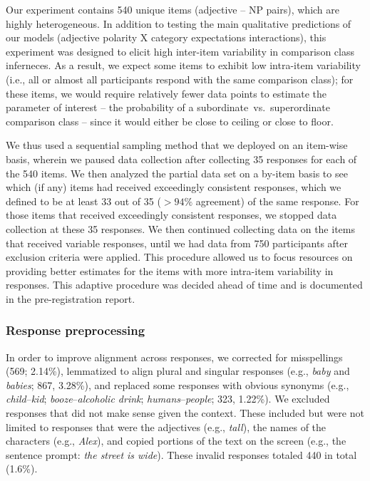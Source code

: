 \documentclass[doc]{apa6}
\begin{document}
Our experiment contains 540 unique items (adjective -- NP pairs), which are highly heterogeneous.
In addition to testing the main qualitative predictions of our models (adjective polarity X category expectations interactions), this experiment was designed to elicit high inter-item variability in comparison class inferneces.
As a result, we expect some items to exhibit low intra-item variability  (i.e., all or almost all participants respond with the same comparison class); for these items, we would require relatively fewer data points to estimate the parameter of interest -- the probability of a subordinate~vs.~superordinate comparison class -- since it would either be close to ceiling or close to floor. 

We thus used a sequential sampling method that we deployed on an item-wise basis, wherein we paused data collection after collecting 35 responses for each of the 540 items.
We then analyzed the partial data set on a by-item basis to see which (if any) items had received exceedingly consistent responses, which we defined to be at least 33 out of 35  ($>94\%$ agreement) of the same response. 
For those items that received exceedingly consistent responses, we stopped data collection at these 35 responses. 
We then continued collecting data on the items that received variable responses, until we had data from 750 participants after exclusion criteria were applied.
This procedure allowed us to focus resources on providing better estimates for the items with more intra-item variability in responses. 
This adaptive procedure was decided ahead of time and is documented in the pre-registration report. 

\subsubsection{Response preprocessing}

In order to improve alignment across responses, we corrected for misspellings (569; 2.14\%), lemmatized to align plural and singular responses (e.g., \emph{baby} and \emph{babies}; 867, 3.28\%), and replaced some responses with obvious synonyms (e.g., \emph{child}--\emph{kid}; \emph{booze}--\emph{alcoholic drink}; \emph{humans}--\emph{people}; 323, 1.22\%). 
We excluded responses that did not make sense given the context.
These included but were not limited to responses that were the adjectives (e.g., \emph{tall}), the names of the characters (e.g., \emph{Alex}), and copied portions of the text on the screen (e.g., the sentence prompt: \emph{the street is wide}). These invalid responses totaled 440 in total (1.6\%). 
\end{document}
